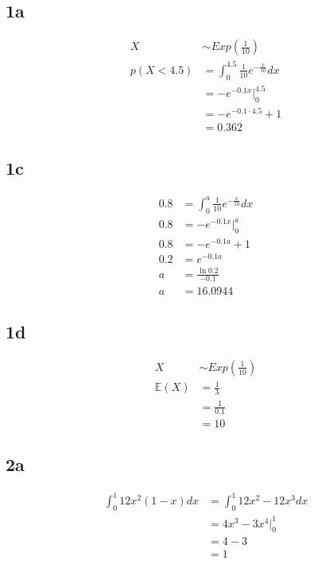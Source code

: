 \documentclass{article}
\begin{document}
\subsection*{1a}
\begin{align*}
X &\sim Exp(\frac{1}{10})\\
p(X<4.5) &= \int_{0}^{4.5} \frac{1}{10}e^{-\frac{x}{10}}dx\\
&= -e^{-0.1x} \Big|_0^{4.5}\\
&= -e^{-0.1 \cdot 4.5} + 1\\
&= 0.362
\end{align*}


\subsection*{1c}
\begin{align*}
0.8 &= \int_{0}^{a} \frac{1}{10}e^{-\frac{x}{10}}dx\\
0.8 &= -e^{-0.1x} \Big|_0^{a}\\
0.8 &= -e^{-0.1a} + 1\\
0.2 &= e^{-0.1a}\\
a &= \frac{\ln0.2}{-0.1}\\
a &= 16.0944
\end{align*}


\subsection*{1d}
\begin{align*}
	X &\sim Exp(\frac{1}{10})\\
	\mathbb{E}(X) &= \frac{1}{\lambda}\\
								&= \frac{1}{0.1} \\
								&= 10
\end{align*}


\subsection*{2a}
\begin{align*}
\int_{0}^{1} 12x^2(1-x)dx &= \int_{0}^{1} 12x^2-12x^3dx\\
													&= 4x^3 - 3x^4 \Big|_0^1\\
													&= 4 - 3\\
													&= 1
\end{align*}
\end{document}
